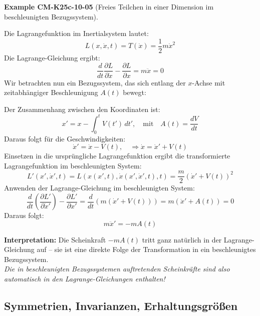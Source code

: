 \documentclass[10pt, letterpaper]{article}
\newcommand{\CustomHeading}[3]{%
  \par\medskip\noindent%
  \textbf{#1 #2} \textnormal{(#3)}.\enskip%
}
\newenvironment{EXA}[2]{\begin{unitbox}\CustomHeading{Example}{#1}{#2}}{\end{unitbox}}
\begin{document}
\begin{EXA}{CM-K25c-10-05}{Freies Teilchen in einer Dimension im beschleunigten Bezugssystem}
Die Lagrangefunktion im Inertialsystem lautet:
\[
L(x,\dot{x},t) = T(\dot{x}) = \frac{1}{2} m \dot{x}^2
\]
Die Lagrange-Gleichung ergibt:
\[
\frac{d}{dt} \frac{\partial L}{\partial \dot{x}} - \frac{\partial L}{\partial x} = m \ddot{x} = 0
\]
Wir betrachten nun ein Bezugssystem, das sich entlang der \( x \)-Achse mit zeitabhängiger Beschleunigung \( A(t) \) bewegt:

\begin{center}
\end{center}

Der Zusammenhang zwischen den Koordinaten ist:
\[
x' = x - \int_0^t V(t') \, dt', 
\quad \text{mit} \quad A(t) = \frac{dV}{dt}
\]
Daraus folgt für die Geschwindigkeiten:
\[
\dot{x}' = \dot{x} - V(t), 
\quad \Rightarrow \dot{x} = \dot{x}' + V(t)
\]
Einsetzen in die ursprüngliche Lagrangefunktion ergibt die transformierte Lagrangefunktion im beschleunigten System:
\[
L'(x', \dot{x}', t) = L(x(x', t), \dot{x}(x', \dot{x}', t), t) = \frac{m}{2}(\dot{x}' + V(t))^2
\]
Anwenden der Lagrange-Gleichung im beschleunigten System:
\[
\frac{d}{dt} \left( \frac{\partial L'}{\partial \dot{x}'} \right) - \frac{\partial L'}{\partial x'} 
= \frac{d}{dt} \left( m (\dot{x}' + V(t)) \right) = m (\ddot{x}' + A(t)) = 0
\]
Daraus folgt:
\[
m \ddot{x}' = -m A(t)
\]

\noindent\textbf{Interpretation:}  
Die Scheinkraft \( -mA(t) \) tritt ganz natürlich in der Lagrange-Gleichung auf – sie ist eine direkte Folge der Transformation in ein beschleunigtes Bezugssystem.  
\\[1ex]
\textit{Die in beschleunigten Bezugssystemen auftretenden Scheinkräfte sind also automatisch in den Lagrange-Gleichungen enthalten!}
\end{EXA}









\pagebreak



\subsection{Symmetrien, Invarianzen, Erhaltungsgrößen}
\end{document}
